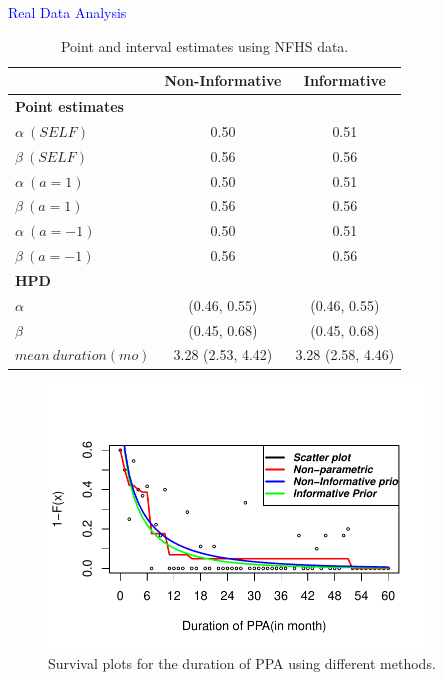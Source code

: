 \documentclass[final]{beamer}
\newlength{\colwidth}
\begin{document}
\begin{frame}[t]
\begin{columns}[t]
\begin{column}{\colwidth}
\begin{block}{\textcolor{blue}{Real Data Analysis}}
{\small\begin{table}[h!]
    \centering
    \caption{Point and interval estimates using NFHS data.}
    \label{tab:comparison}
    \renewcommand{\arraystretch}{1.1} %
    \setlength{\tabcolsep}{4pt} %
    \begin{tabular}{lcc}
        \toprule
        & \textbf{Non-Informative} & \textbf{Informative} \\
        \midrule
        \multicolumn{3}{l}{\textbf{Point estimates}} \\
        $\alpha \ (SELF)$           & 0.50                  & 0.51               \\
        $\beta\ (SELF)$             & 0.56                  & 0.56               \\
        $\alpha \ (a=1)$            & 0.50                  & 0.51       \\
        $\beta\ (a=1)$              & 0.56                  & 0.56       \\
        $\alpha \ (a=-1)$           & 0.50                  & 0.51        \\
        $\beta\ (a=-1)$             & 0.56                  & 0.56        \\
        \midrule
        \multicolumn{3}{l}{\textbf{HPD}} \\
        $\alpha$      & (0.46, 0.55)        & (0.46, 0.55)     \\ 
        $\beta$       & (0.45, 0.68)        & (0.45, 0.68)     \\
        \midrule
        $mean \ duration (mo)$       & 3.28 (2.53, 4.42) &      3.28 (2.58, 4.46) \\
        \bottomrule
    \end{tabular}
\end{table}}

\begin{figure}[h!]
    \centering
    \includegraphics[width=0.9\textwidth, height=0.7\textheight, keepaspectratio]{Rplot02.pdf}
    \caption{Survival plots for the duration of PPA using different methods.}
    \label{fig:survival}
\end{figure}


\end{block}
\end{column}
\end{columns}
\end{frame}
\end{document}
